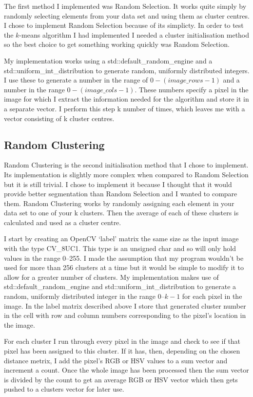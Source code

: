 \documentclass{article}
\begin{document}
The first method I implemented was Random Selection. It works quite simply by randomly selecting elements from your data set and using them as cluster centres. I chose to implement Random Selection because of its simplicty. In order to test the $k$-means algorithm I had implemented I needed a cluster initialisation method so the best choice to get something working quickly was Random Selection. 

My implementation works using a std::default\_random\_engine and a std::uniform\_int\_distribution to generate random, uniformly distributed integers. I use these to generate a number in the range of $0-(image\_rows-1)$ and a number in the range $0-(image\_cols-1)$. These numbers specify a pixel in the image for which I extract the information needed for the algorithm and store it in a separate vector. I perform this step k number of times, which leaves me with a vector consisting of k cluster centres.

\subsection{Random Clustering}

Random Clustering is the second initialisation method that I chose to implement. Its implementation is slightly more complex when compared to Random Selection but it is still trivial. I chose to implement it because I thought that it would provide better segmentation than Random Selection and I wanted to compare them. Random Clustering works by randomly assigning each element in your data set to one of your k clusters. Then the average of each of these clusters is calculated and used as a cluster centre. 

I start by creating an OpenCV `label' matrix the same size as the input image with the type CV\_8UC1. This type is an unsigned char and so will only hold values in the range 0--255. I made the assumption that my program wouldn't be used for more than 256 clusters at a time but it would be simple to modify it to allow for a greater number of clusters.  My implementation makes use of std::default\_random\_engine and std::uniform\_int\_distribution to generate a random, uniformly distributed integer in the range 0--$k-1$ for each pixel in the image. In the label matrix described above I store that generated cluster number in the cell with row and column numbers corresponding to the pixel's location in the image.

For each cluster I run through every pixel in the image and check to see if that pixel has been assigned to this cluster. If it has, then, depending on the chosen distance metrix, I add the pixel's RGB or HSV values to a sum vector and increment a count. Once the whole image has been processed then the sum vector is divided by the count to get an average RGB or HSV vector which then gets pushed to a clusters vector for later use.
\end{document}
